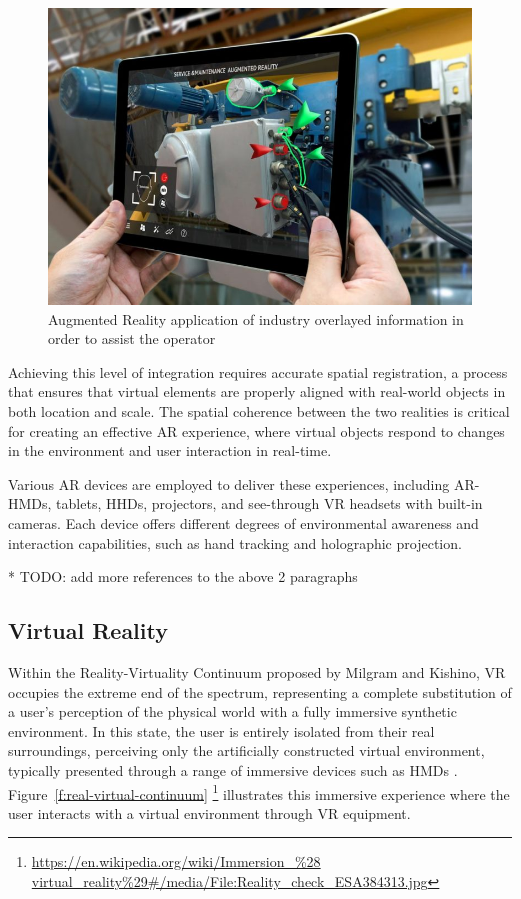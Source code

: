    \begin{figure}[!htpb]
        \centering
        \includegraphics[width=0.6\linewidth]{figs/ar-example.jpg}
        \caption{Augmented Reality application of industry overlayed information in order to assist the operator}
        \label{f:ar-example}
    \end{figure}

    Achieving this level of integration requires accurate spatial registration, a process that ensures that virtual elements are properly aligned with real-world objects in both location and scale. The spatial coherence between the two realities is critical for creating an effective \ac{AR} experience, where virtual objects respond to changes in the environment and user interaction in real-time. 

    Various \ac{AR} devices are employed to deliver these experiences, including \ac{AR}-\ac{HMDs}, tablets, \ac{HHDs}, projectors, and see-through \ac{VR} headsets with built-in cameras. Each device offers different degrees of environmental awareness and interaction capabilities, such as hand tracking and holographic projection. 

    * TODO: add more references to the above 2 paragraphs

\subsection{Virtual Reality}
    
    Within the Reality-Virtuality Continuum proposed by Milgram and Kishino, \ac{VR} occupies the extreme end of the spectrum, representing a complete substitution of a user’s perception of the physical world with a fully immersive synthetic environment. In this state, the user is entirely isolated from their real surroundings, perceiving only the artificially constructed virtual environment, typically presented through a range of immersive devices such as \ac{HMDs} \cite{milgram1994}. Figure~\ref{f:real-virtual-continuum} \footnote{\url{https://en.wikipedia.org/wiki/Immersion_\%28
    virtual_reality\%29\#/media/File:Reality_check_ESA384313.jpg}} illustrates this immersive experience where the user interacts with a virtual environment through \ac{VR} equipment.

